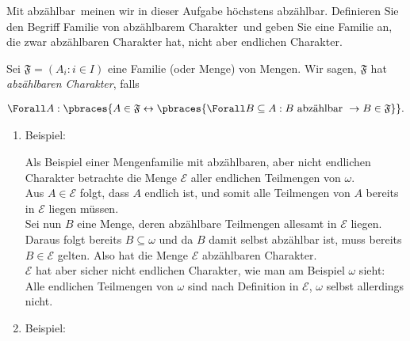
\begin{exercise}[278]

Mit \glqq abzählbar\grqq\  meinen wir in dieser Aufgabe \glqq höchstens abzählbar\grqq.
Definieren Sie den Begriff \glqq Familie von abzählbarem Charakter\grqq\ und geben
Sie eine Familie an, die zwar abzählbaren Charakter hat, nicht aber endlichen Charakter.

\end{exercise}


\begin{solution}

Sei $\mathfrak{F} = (A_i: i \in I)$ eine Familie (oder Menge) von Mengen.
Wir sagen, $\mathfrak{F}$ hat \textit{abzählbaren Charakter}, falls

\begin{align*}
  \Forall A:
  \pbraces
  {
    A \in \mathfrak{F}
    \leftrightarrow
    \pbraces
    {
      \Forall B \subseteq A:
      B ~\text{abzählbar}~
      \to
      B \in \mathfrak{F}
    }
  }.
\end{align*}

\begin{enumerate}[label = \arabic*.]

  \item Beispiel:

  Als Beispiel einer Mengenfamilie mit abzählbaren, aber nicht endlichen Charakter
  betrachte die Menge $\mathcal{E}$ aller endlichen Teilmengen von $\omega$. \\
  Aus $A \in \mathcal{E}$ folgt, dass $A$ endlich ist, und somit alle Teilmengen
  von $A$ bereits in $\mathcal{E}$ liegen müssen. \\
  Sei nun $B$ eine Menge, deren abzählbare Teilmengen allesamt in $\mathcal{E}$
  liegen. Daraus folgt bereits $B \subseteq \omega$ und da $B$ damit selbst abzählbar ist,
  muss bereits $B \in \mathcal{E}$ gelten. Also hat die Menge $\mathcal{E}$ abzählbaren
  Charakter. \\
  $\mathcal{E}$ hat aber sicher nicht endlichen Charakter, wie man am Beispiel $\omega$
  sieht: Alle endlichen Teilmengen von $\omega$ sind nach Definition in $\mathcal{E}$,
  $\omega$ selbst allerdings nicht.

  \item Beispiel:
  

\end{enumerate}
\end{solution}
